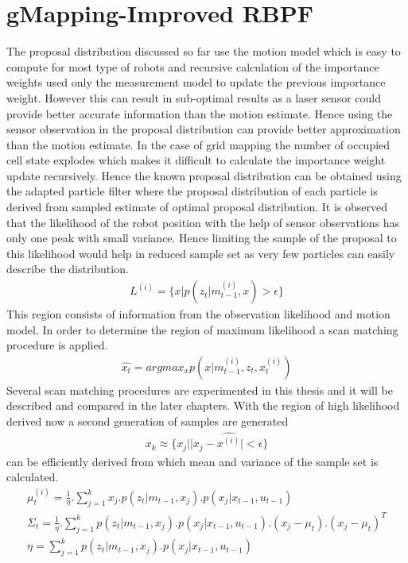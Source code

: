 \section{gMapping-Improved RBPF}
The proposal distribution discussed so far use the motion model which is easy to compute for most type of robots and recursive calculation of the importance weights used only the measurement model to update the previous importance weight. However this can result in sub-optimal results as a laser sensor could provide better accurate information than the motion estimate. Hence using the sensor observation in the proposal distribution can provide better approximation than the motion estimate. In the case of grid mapping the number of occupied cell state explodes which makes it difficult to calculate the importance weight update recursively. Hence the known proposal distribution can be obtained using the adapted particle filter where the proposal distribution of each particle is derived from sampled estimate of optimal proposal distribution. It is observed that the likelihood of the robot position with the help of sensor observations has only one peak with small variance. Hence limiting the sample of the proposal
to this likelihood would help in reduced sample set as very few particles can easily describe the distribution. 
\begin{gather} \label{gMap-L}
    L^{(i)} = \{ x | p(z_t| m_{t-1}^{(i)},x)>\epsilon\} 
\end{gather}
This region consists of information from the observation likelihood and motion model. In order to determine the region of maximum likelihood a scan matching procedure is applied. 
\begin{gather} \label{gMap-SM}
    \hat{x_t} = argmax_x p(x|m_{t-1}^{(i)}, z_t, x_t^{(i)})
\end{gather}
Several scan matching procedures are experimented in this thesis and it will be described and compared in the later chapters. With the region of high likelihood derived now a second generation of samples are generated 
\begin{gather} \label{gMap-2samp}
    x_k \approx \{x_j | |x_j - \hat{x^{(i)}}|<\epsilon \}
\end{gather}
can be efficiently derived from which mean and variance of the sample set is calculated. 
\begin{gather} \label{gMap-mu}
    \mu_t^{(i)} = \frac{1}{\eta}. \sum_{j = 1}^{k}  x_j.p(z_t | m_{t-1}, x_j). p(x_j | x_{t-1}, u_{t-1}) \\
    \varSigma_t = \frac{1}{\eta}. \sum_{j = 1}^{k}  p(z_t | m_{t-1}, x_j). p(x_j | x_{t-1}, u_{t-1}).(x_j - \mu_t).(x_j - \mu_t)^T \\
    \eta = \sum_{j = 1}^{k}  p(z_t | m_{t-1}, x_j). p(x_j | x_{t-1}, u_{t-1})
\end{gather}
